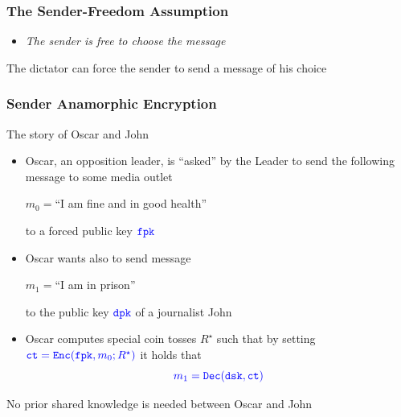 \documentclass[handout]{beamer}
\begin{document}
\begin{frame}
\frametitle{The Sender-Freedom Assumption}

\begin{itemize}
\item {\em\color{brown} The sender is free to choose the message
}

\end{itemize}

\vfill
The dictator can force the sender to send
a message of his choice




\end{frame}

\begin{frame}
\frametitle{Sender Anamorphic Encryption}
\begin{block}{The story of Oscar and John}
\begin{itemize}[<+->]
\item {\color{green} Oscar}, an opposition leader, is ``asked'' by 
the Leader to send the following message to some media outlet

    \centerline{\color{purple} $m_0=$``I am fine and in good health''}

    to a {\color{purple} forced} public key $\color{blue} \mathtt{fpk}$

\item {\color{green} Oscar} wants also to send message 

\centerline{\color{purple} $m_1=$``I am in prison''}
 to the public key $\color{blue} \mathtt{dpk}$ of a journalist {\color{green} John} 
\item {\color{green} Oscar} computes special coin tosses $R^\star$ such that
by setting
    $\color{blue} \mathtt{ct}=\mathtt{Enc}(\mathtt{fpk},m_0;R^\star)$
it holds that 
$$\color{blue} m_1=\mathtt{Dec}(\mathtt{dsk},\mathtt{ct})$$
\end{itemize}
\pause
{\color{red}
No prior shared knowledge is needed between {\color{green} Oscar} and {\color{green} John}
}
\end{block}
\end{frame}

\end{document}
